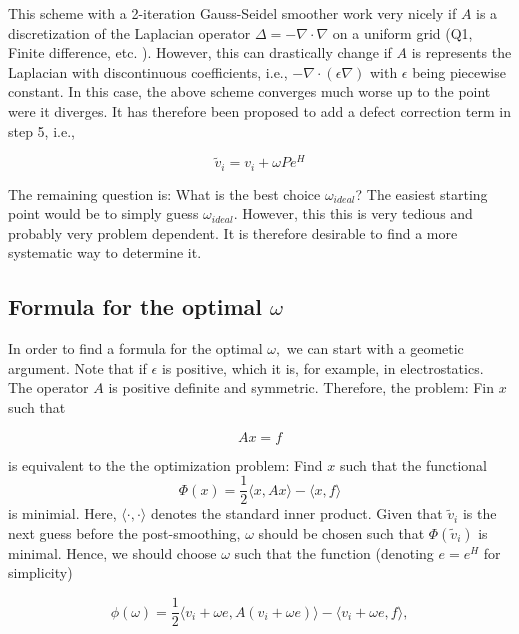 \documentclass[12pt, a4paper]{article}
\begin{document}
\noindent
This scheme with a 2-iteration Gauss-Seidel smoother work very nicely if $A$ is a discretization of the Laplacian operator $\Delta = -\nabla \cdot \nabla$ on a uniform grid (Q1, Finite difference, etc. ). However, this can drastically change if $A$ is represents the Laplacian with discontinuous coefficients, i.e., $-\nabla \cdot (\epsilon \nabla)$ with $\epsilon$ being piecewise constant. In this case, the above scheme converges much worse up to the point were it diverges. It has therefore been proposed to add a defect correction term in step 5, i.e.,

\begin{equation}
  \tilde{v}_i = v_i + \omega P e^H 
\end{equation}


\noindent
The remaining question is: What is the best choice $\omega_{\textit{ideal}}$? The easiest starting point would be to simply guess $\omega_{\textit{ideal}}.$ However, this this is very tedious and probably very problem dependent. It is therefore desirable to find a more systematic way to determine it.  

\newpage

\subsection{Formula for the optimal $\omega$}

In order to find a formula for the optimal $\omega,$ we can start with a geometic argument. Note that if $\epsilon$ is positive, which it is, for example, in electrostatics. The operator $A$ is positive definite and symmetric. Therefore, the problem: Fin $x$ such that 

\begin{equation}
  Ax = f
\end{equation}


\noindent
is equivalent to the the optimization problem: Find $x$ such that the functional
\begin{equation}
  \Phi(x) = \frac{1}{2} \langle x,  A x \rangle - \langle x , f \rangle
\end{equation}
is minimial. Here, $\langle \cdot, \cdot \rangle$ denotes the standard inner product. Given that $\tilde{v}_i$ is the next guess before the post-smoothing, $\omega$ should be chosen such that $\Phi(\tilde{v}_i)$ is minimal. Hence, we should choose $\omega$ such that the function (denoting $e = e^H$ for simplicity)

\begin{equation}
 \phi(\omega) = \frac{1}{2} \langle v_i + \omega e,  A (v_i + \omega  e) \rangle - \langle v_i + \omega  e , f \rangle,
\end{equation}
\end{document}
